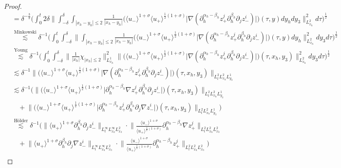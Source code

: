 \documentclass[10pt,reqno]{amsart}
\numberwithin{equation}{section}
\begin{document}
\begin{proof}
\begin{align*}
		&=\delta^{-\frac{3}{2}}\bigg(\int_0^t2\delta\Big\|\int_{-\delta}^{\delta}\int_{|x_h-y_h|\leqslant 2}\frac{1}{|x_h-y_h|} \Big(\langle u_-\rangle^{1+\sigma}\langle u_+\rangle^{\frac{1}{2}(1+\sigma)}\big|\nabla(\partial_{h}^{\alpha_h-\beta_h}z_+^j\partial_{h}^{\beta_h}\partial_jz_-^i)\big|\Big)(\tau,y)dy_hdy_3\Big\|^2_{L^2_{x_h}}d\tau\bigg)^{\frac{1}{2}}\\
		&\stackrel{\text{Minkowski}}{\lesssim}\delta^{-1}\bigg(\!\int_0^t\!\int_{-\delta}^{\delta}\Big\|\int_{|x_h-y_h|\leqslant 2}\!\frac{1}{|x_h-y_h|} \Big(\langle u_-\rangle^{1+\sigma}\!\langle u_+\rangle^{\frac{1}{2}(1+\sigma)}\big|\nabla(\partial_{h}^{\alpha_h-\beta_h}z_+^j\partial_{h}^{\beta_h}\partial_jz_-^i)\big|\Big)(\tau,y)dy_h\Big\|^2_{L^2_{x_h}}\!dy_3d\tau\!\bigg)^{\frac{1}{2}}\\
		&\stackrel{\text{Young}}{\lesssim}\delta^{-1}\bigg(\int_0^t\int_{-\delta}^{\delta}\Big\|\frac{1}{|x_h|}\chi_{|x_h|\leqslant 2}\Big\|^2_{L^1_{x_h}} \Big\|\Big(\langle u_-\rangle^{1+\sigma}\langle u_+\rangle^{\frac{1}{2}(1+\sigma)}\big|\nabla(\partial_{h}^{\alpha_h-\beta_h}z_+^j\partial_{h}^{\beta_h}\partial_jz_-^i)\big|\Big)(\tau,x_h,y_3)\Big\|^2_{L^2_{x_h}}dy_3d\tau\bigg)^{\frac{1}{2}}\\
		&\lesssim\delta^{-1}\Big\|\Big(\langle u_-\rangle^{1+\sigma}\langle u_+\rangle^{\frac{1}{2}(1+\sigma)}\big|\nabla(\partial_{h}^{\alpha_h-\beta_h}z_+^j\partial_{h}^{\beta_h}\partial_jz_-^i)\big|\Big)(\tau,x_h,y_3)\Big\|_{L^2_t L^2_{x_h}L^1_{y_3}}\\
		&\lesssim\delta^{-1}\Big(\Big\|\Big(\langle u_-\rangle^{1+\sigma}\langle u_+\rangle^{\frac{1}{2}(1+\sigma)}\big|\partial_{h}^{\alpha_h-\beta_h}\nabla z_+^j\partial_{h}^{\beta_h}\partial_jz_-^i\big|\Big)(\tau,x_h,y_3)\Big\|_{L^2_t L^2_{x_h}L^1_{y_3}}\\
		&\ \ \ \ +\Big\|\Big(\langle u_-\rangle^{1+\sigma}\langle u_+\rangle^{\frac{1}{2}(1+\sigma)}\big|\partial_{h}^{\alpha_h-\beta_h}z_+^j\partial_{h}^{\beta_h}\partial_j\nabla z_-^i\big|\Big)(\tau,x_h,y_3)\Big\|_{L^2_t L^2_{x_h}L^1_{y_3}}\Big)\\
		&\stackrel{\text{H\"older}}{\lesssim}\delta^{-1}\Big(\big\|\langle u_+\rangle^{1+\sigma}\partial_{h}^{\beta_h}\partial_jz_-^i\big\|_{L^\infty_tL^\infty_{x_h}L^2_{x_3}}\cdot\Big\|\frac{\langle u_-\rangle^{1+\sigma}}{\langle u_+\rangle^{\frac{1}{2}(1+\sigma)}}\partial_{h}^{\alpha_h-\beta_h}\nabla z_+^j\Big\|_{L^2_tL^2_{x_h}L^2_{x_3}}\\
		&\ \ \ \ +\big\|\langle u_+\rangle^{1+\sigma}\partial_{h}^{\beta_h}\partial_j\nabla z_-^i\big\|_{L^\infty_tL^\infty_{x_h}L^2_{x_3}}\cdot\Big\|\frac{\langle u_-\rangle^{1+\sigma}}{\langle u_+\rangle^{\frac{1}{2}(1+\sigma)}}\partial_{h}^{\alpha_h-\beta_h} z_+^j\Big\|_{L^2_tL^2_{x_h}L^2_{x_3}}\Big)\\

\end{align*}
\end{proof}
\end{document}
